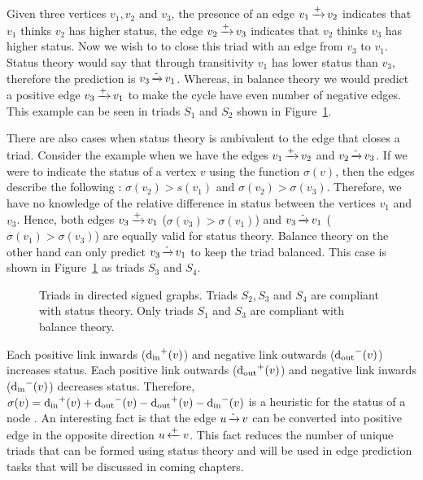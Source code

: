 Given three vertices $v_1,v_2$ and $v_3$, the presence of an edge $v_1 \operatorname*{\xrightarrow{+}} v_2$ indicates that $v_1$ thinks $v_2$ has higher status, the edge $v_2 \operatorname*{\xrightarrow{+}} v_3$ indicates that $v_2$ thinks $v_3$ has higher status. Now we wish to to close this triad with an edge from $v_3$ to $v_1$. Status theory would say that through transitivity $v_1$ has lower status than $v_3$, therefore the prediction is $v_3 \operatorname*{\xrightarrow{-}} v_1$. Whereas, in balance theory we would predict a positive edge $v_3 \operatorname*{\xrightarrow{+}} v_1$ to make the cycle have even number of negative edges. This example can be seen in triads $S_1$ and $S_2$ shown in Figure~\ref{fig:status-triads}.

There are also cases when status theory is ambivalent to the edge that closes a triad. Consider the example when we have the edges $v_1 \operatorname*{\xrightarrow{+}} v_2$ and $v_2 \operatorname*{\xrightarrow{-}} v_3$. If we were to indicate the status of a vertex $v$ using the function $\sigma(v)$, then the edges describe the following : $\sigma(v_2)>s(v_1) $ and $\sigma(v_2)>\sigma(v_3)$. Therefore, we have no knowledge of the relative difference in status between the vertices $v_1$ and $v_3$. Hence, both edges $v_3 \operatorname*{\xrightarrow{+}} v_1$ ($\sigma(v_3) > \sigma(v_1)$) and $v_3 \operatorname*{\xrightarrow{-}} v_1$ ($\sigma(v_1) > \sigma(v_3)$) are equally valid for status theory. Balance theory on the other hand can only predict $v_3 \operatorname*{\xrightarrow{-}} v_1$ to keep the triad balanced. This case is shown in Figure~\ref{fig:status-triads} as triads $S_3$ and $S_4$.

\begin{figure}[!ht] 
    \centering
    
    \caption{Triads in directed signed graphs. Triads $S_2,S_3$ and $S_4$ are compliant with status theory. Only triads $S_1$ and $S_3$ are compliant with balance theory.}
    \label{fig:status-triads}
\end{figure}

Each positive link inwards ($\operatorname*{d_{\text{in}}}^{+}(v)$) and negative link outwards ($\operatorname*{d_{\text{out}}}^{-}(v)$) increases status. Each positive link outwards ($\operatorname*{d_{\text{out}}}^{+}(v)$) and negative link inwards ($\operatorname*{d_{\text{in}}}^{-}(v)$) decreases status. Therefore, $\sigma(v) = \operatorname*{d_{\text{in}}}^{+}(v) + \operatorname*{d_{\text{out}}}^{-}(v) - \operatorname*{d_{\text{out}}}^{+}(v)- \operatorname*{d_{\text{in}}}^{-}(v)$ is a heuristic for the status of a node \cite{leskovec2010predicting}. An interesting fact is that the edge $u \operatorname*{\xrightarrow{-}} v$ can be converted into positive edge in the opposite direction $u \operatorname*{\xleftarrow{+}} v$. This fact reduces the number of unique triads that can be formed using status theory and will be used in edge prediction tasks that will be discussed in coming chapters.

